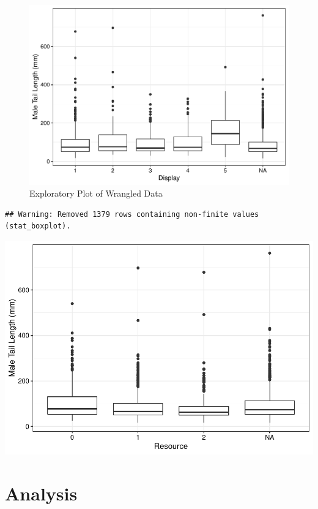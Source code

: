 \documentclass[
  12pt,
]{article}
\begin{document}
\begin{figure}
\centering
\includegraphics{Project_Code_files/figure-latex/r exploratory_plots_5-1.pdf}
\caption{Exploratory Plot of Wrangled Data}
\end{figure}

\begin{verbatim}
## Warning: Removed 1379 rows containing non-finite values (stat_boxplot).
\end{verbatim}

\includegraphics{Project_Code_files/figure-latex/exploratory_plots_6-1.pdf}
\newpage

\hypertarget{analysis}{%
\section{Analysis}\label{analysis}}
\end{document}
